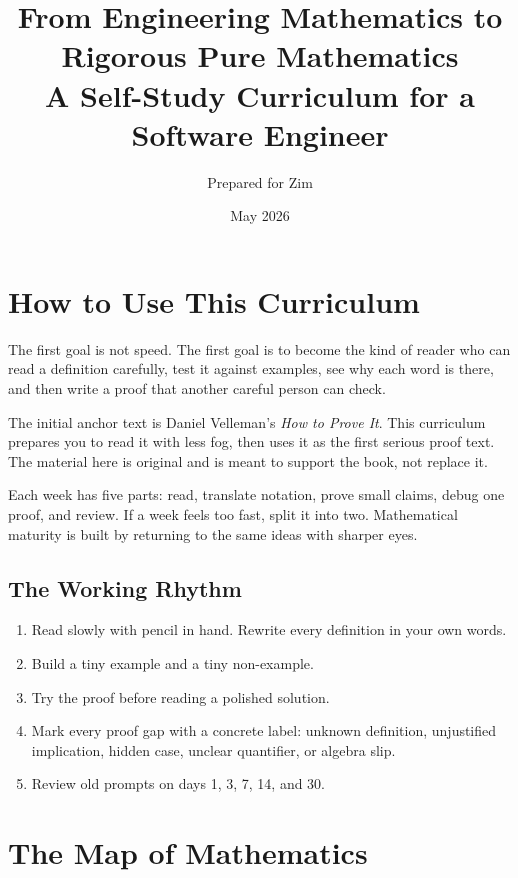 \documentclass[11pt]{article}
\title{\textbf{From Engineering Mathematics to Rigorous Pure Mathematics}\\A Self-Study Curriculum for a Software Engineer}
\author{Prepared for Zim}
\date{May 2026}
\begin{document}
\maketitle
\tableofcontents
\newpage

\section{How to Use This Curriculum}

The first goal is not speed. The first goal is to become the kind of reader who can read a definition carefully, test it against examples, see why each word is there, and then write a proof that another careful person can check.

The initial anchor text is Daniel Velleman's \emph{How to Prove It}. This curriculum prepares you to read it with less fog, then uses it as the first serious proof text. The material here is original and is meant to support the book, not replace it.

\begin{focusbox}
Each week has five parts: read, translate notation, prove small claims, debug one proof, and review. If a week feels too fast, split it into two. Mathematical maturity is built by returning to the same ideas with sharper eyes.
\end{focusbox}

\subsection{The Working Rhythm}

\begin{enumerate}
\item Read slowly with pencil in hand. Rewrite every definition in your own words.
\item Build a tiny example and a tiny non-example.
\item Try the proof before reading a polished solution.
\item Mark every proof gap with a concrete label: unknown definition, unjustified implication, hidden case, unclear quantifier, or algebra slip.
\item Review old prompts on days 1, 3, 7, 14, and 30.
\end{enumerate}

\section{The Map of Mathematics}
\end{document}

